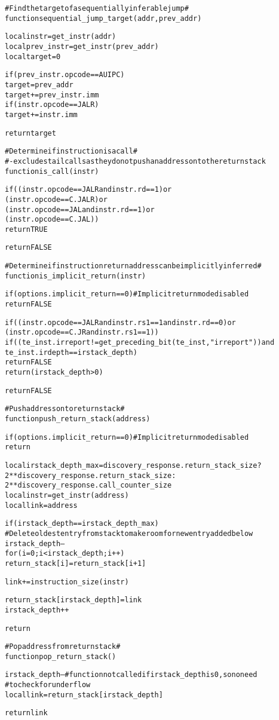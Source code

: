 \begin{alltt}
# Find the target of a sequentially inferable jump #
function sequential_jump_target (addr, prev_addr)

  local instr      = get_instr(addr)
  local prev_instr = get_instr(prev_addr)
  local target     = 0

  if (prev_instr.opcode == AUIPC)
    target = prev_addr
  target += prev_instr.imm
  if (instr.opcode == JALR)
    target += instr.imm

  return target

# Determine if instruction is a call #
# - excludes tail calls as they do not push an address onto the return stack
function is_call (instr)

  if ((instr.opcode == JALR and instr.rd == 1) or
      (instr.opcode == C.JALR)                 or
      (instr.opcode == JAL  and instr.rd == 1) or
      (instr.opcode == C.JAL))
    return TRUE

  return FALSE

# Determine if instruction return address can be implicitly inferred #
function is_implicit_return (instr)

  if (options.implicit_return == 0) # Implicit return mode disabled
    return FALSE

  if ((instr.opcode == JALR and instr.rs1 == 1 and instr.rd == 0) or
      (instr.opcode == C.JR and instr.rs1 == 1))
    if ((te_inst.irreport != get_preceding_bit(te_inst, "irreport")) and 
         te_inst.irdepth == irstack_depth)
      return FALSE 
    return (irstack_depth > 0)

  return FALSE
\end{alltt}

\pagebreak

\begin{alltt}
# Push address onto return stack #
function push_return_stack (address)

  if (options.implicit_return == 0) # Implicit return mode disabled
    return

  local irstack_depth_max = discovery_response.return_stack_size ?
                             2**discovery_response.return_stack_size :
                             2**discovery_response.call_counter_size
  local instr             = get_instr(address)
  local link              = address

  if (irstack_depth == irstack_depth_max)
    # Delete oldest entry from stack to make room for new entry added below
    irstack_depth--
    for (i = 0; i < irstack_depth; i++)
      return_stack[i] = return_stack[i+1]

  link += instruction_size(instr)

  return_stack[irstack_depth] = link
  irstack_depth++

  return

# Pop address from return stack #
function pop_return_stack ()

  irstack_depth-- # function not called if irstack_depth is 0, so no need
                  #  to check for underflow
  local  link = return_stack[irstack_depth]

  return link

\end{alltt}
